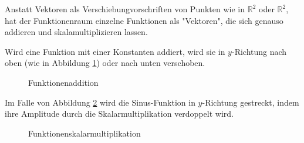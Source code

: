 Anstatt Vektoren als Verschiebungvorschriften von Punkten wie in $\mathbb{R}^2$ oder $\mathbb{R}^2$, hat der Funktionenraum einzelne Funktionen als "Vektoren", die sich genauso addieren und skalamultiplizieren lassen.
\newpage
\begin{example}
Wird eine Funktion mit einer Konstanten addiert, wird sie in $y$-Richtung nach oben (wie in Abbildung \ref{fig:fadd}) oder nach unten verschoben.
\end{example}
\begin{figure}[h]
\begin{minipage}[h]{.5\textwidth}
\end{minipage}
\hfil
\begin{minipage}[h]{.5\textwidth}
\end{minipage}
\caption{Funktionenaddition}
\label{fig:fadd}
\end{figure}

\begin{example}
Im Falle von Abbildung \ref{fig:fskl} wird die Sinus-Funktion in $y$-Richtung gestreckt, indem ihre Amplitude durch die Skalarmultiplikation verdoppelt wird.
\end{example}
\begin{figure}[h]
\centering
{}
\caption{Funktionenskalarmultiplikation}
\label{fig:fskl}
\end{figure}


